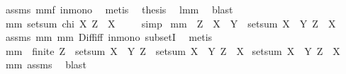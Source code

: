 \begin{isabellebody}
\ assms\ mm{}{}f\ in{\isacharunderscore}mono\ \isamarkupfalse%
\ metis\ \isamarkupfalse%
\ {\isacharquery}thesis\ \isamarkupfalse%
\ lmm{}{}\ \isamarkupfalse%
\ blast\ \isanewline
{}\isamarkupfalse%
%
\endisatagproof
{\isafoldproof}%
%
\isadelimproof
\isanewline
%
\endisadelimproof
\isanewline
{}\isamarkupfalse%
\ mm{}{}{\isacharcolon}\ {\isachardoublequoteopen}setsum\ {\isacharparenleft}chi\ X{\isacharparenright}\ {\isacharparenleft}Z\ {\isacharminus}\ X{\isacharparenright}\ {\isacharequal}\ {}{\isachardoublequoteclose}%
\isadelimproof
\ %
\endisadelimproof
%
\isatagproof
{}\isamarkupfalse%
\ simp%
\endisatagproof
{\isafoldproof}%
%
\isadelimproof
%
\endisadelimproof
\isanewline
\isanewline
{}\isamarkupfalse%
\ mm{}{}{\isacharcolon}\ \ {\isachardoublequoteopen}Z\ {\isasymsubseteq}\ X\ {\isasymunion}\ Y{\isachardoublequoteclose}\ \ {\isachardoublequoteopen}setsum\ {\isacharparenleft}X\ {\isacharless}{\isacharbar}\ Y{\isacharparenright}\ {\isacharparenleft}Z\ {\isacharminus}\ X{\isacharparenright}\ {\isacharequal}\ {}{\isachardoublequoteclose}\ \isanewline
%
\isadelimproof
%
\endisadelimproof
%
\isatagproof
{}\isamarkupfalse%
\ assms\ mm{}{}\ mm{}{}\ Diff{\isacharunderscore}iff\ in{\isacharunderscore}mono\ subsetI\ \isamarkupfalse%
\ metis%
\endisatagproof
{\isafoldproof}%
%
\isadelimproof
\isanewline
%
\endisadelimproof
\isanewline
{}\isamarkupfalse%
\ mm{}{}{\isacharcolon}\ \ {\isachardoublequoteopen}finite\ Z{\isachardoublequoteclose}\ \ {\isachardoublequoteopen}setsum\ {\isacharparenleft}X\ {\isacharless}{\isacharbar}\ Y{\isacharparenright}\ Z\ {\isacharequal}\ setsum\ {\isacharparenleft}X\ {\isacharless}{\isacharbar}\ Y{\isacharparenright}\ {\isacharparenleft}Z\ {\isacharminus}\ X{\isacharparenright}\ \isanewline
{\isacharplus}{\isacharparenleft}setsum\ {\isacharparenleft}X\ {\isacharless}{\isacharbar}\ Y{\isacharparenright}\ {\isacharparenleft}Z\ {\isasyminter}\ X{\isacharparenright}{\isacharparenright}{\isachardoublequoteclose}%
\isadelimproof
\ %
\endisadelimproof
%
\isatagproof
{}\isamarkupfalse%
\ mm{}{}\ assms\ \isamarkupfalse%
\ blast%
\endisatagproof

\end{isabellebody}
